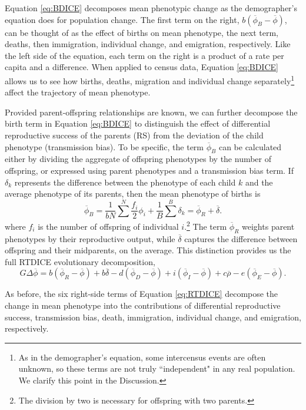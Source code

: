 Equation \ref{eq:BDICE} decomposes mean phenotypic change as the demographer's equation does for population change.  The first term on the right, $b(\overline{\phi}_B - \overline{\phi})$, can be thought of as the effect of births on mean phenotype, the next term, deaths, then immigration, individual change, and emigration, respectively.  Like the left side of the equation, each term on the right is a product of a rate per capita and a difference.  When applied to census data, Equation \ref{eq:BDICE} allows us to see how births, deaths, migration and individual change separately\footnote{As in the demographer's equation, some intercensus events are often unknown, so these terms are not truly ``independent" in any real population. We clarify this point in the Discussion.} affect the trajectory of mean phenotype.  

Provided parent-offspring relationships are known, we can further decompose the birth term in Equation \ref{eq:BDICE} to distinguish the effect of differential reproductive success of the parents (RS) from the deviation of the child phenotype (transmission bias).  To be specific, the term $\overline{\phi}_B$ can be calculated either by dividing the aggregate of offspring phenotypes by the number of offspring, or expressed using parent phenotypes and a transmission bias term.  If $\delta_k$ represents the difference between the phenotype of each child $k$ and the average phenotype of its parents, then the mean phenotype of births is
	\[\overline{\phi}_B = \frac{1}{bN} \sum^N \frac{f_i}{2} \phi_i + \frac{1}{B} \sum^B \delta_k = \overline{\phi}_{R} + \overline{\delta}.
\]
where $f_i$ is the number of offspring of individual $i$.\footnote{The division by two is necessary for offspring with two parents.}  The term $\overline{\phi}_{R}$ weights parent phenotypes by their reproductive output, while $\overline{\delta}$ captures the difference between offspring and their midparents, on the average.  This distinction provides us the full RTDICE evolutionary decomposition,
\begin{equation}  \label{eq:RTDICE}
G\Delta \overline{\phi} = b(\overline{\phi}_{R} - \overline{\phi}) + b \overline{\delta} - d(\overline{\phi}_D - \overline{\phi}) + i(\overline{\phi}_I - \overline{\phi}) + c \overline{\rho} - e(\overline{\phi}_E - \overline{\phi}).
\end{equation}

As before, the six right-side terms of Equation \ref{eq:RTDICE} decompose the change in mean phenotype into the contributions of differential reproductive success, transmission bias, death, immigration, individual change, and emigration, respectively. 

